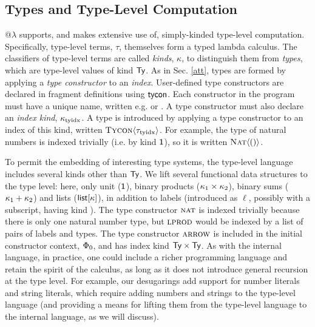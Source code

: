 \documentclass[10pt,preprint]{sigplanconf}
\begin{document}
{\subsection{Types and Type-Level Computation}\label{types}
@$\lambda$ supports, and makes extensive use of, simply-kinded type-level computation. Specifically, type-level terms, $\tau$, themselves form a typed lambda calculus. The classifiers of type-level terms are called \emph{kinds}, $\kappa$, to distinguish them from  \emph{types}, which are  type-level values of kind $\textsf{Ty}$. %
As in Sec. \ref{att}, types are formed by applying a \emph{type constructor} to an \emph{index}. User-defined type constructors are declared in fragment definitions using ${\sf tycon}$. Each constructor in the program must have a unique name, written e.g.  or . %
A type constructor must also declare an \emph{index kind}, $\kappa_{\text{tyidx}}$. A type is introduced by applying a type constructor to an index of this kind, written $\textsc{Tycon}\langle{\tau_{\text{tyidx}}}\rangle$.  For example, the type of natural numbers is indexed trivially (i.e. by kind $\textsf{1}$), so it is written $\textsc{Nat}\langle()\rangle$.

 To permit the embedding of interesting type systems, the type-level language includes several kinds other than $\textsf{Ty}$. We lift several functional data structures to the type level: here, only unit ($\textsf{1}$), binary products ($\kappa_1 \times \kappa_2$), binary sums ($\kappa_1 + \kappa_2$) and lists ($\textsf{list}[\kappa]$), in addition to labels (introduced as $\ell$, possibly with a subscript, having kind ).  The type constructor $\textsc{nat}$ is indexed trivially because there is only one natural number type, but $\textsc{lprod}$ would be indexed by a list of pairs of {labels}  and types. The type constructor $\textsc{arrow}$ is included in the initial constructor context, $\Phi_0$, and has index kind $\textsf{Ty} \times \textsf{Ty}$.
 As with the internal language, in practice, one could include a richer programming language and retain the spirit of the calculus, as long as it does not introduce general recursion at the type level. For example, our desugarings add support for number literals and string literals, which require adding numbers and strings to the type-level language (and providing a means for lifting them from the type-level language to the internal language, as we will discuss).
  
}
\end{document}
